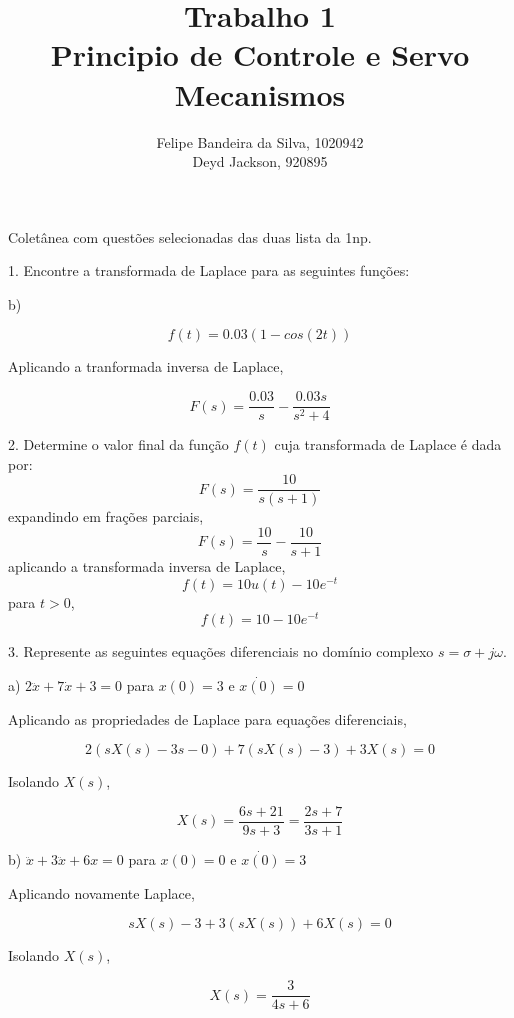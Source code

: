 \documentclass[paper=a4, fontsize=11pt]{article}
\title{Trabalho 1\\Principio de Controle e Servo Mecanismos}
\author{Felipe Bandeira da Silva, 1020942\\Deyd Jackson, 920895}
\begin{document}
\maketitle

Coletânea com questões selecionadas das duas lista da 1np.



\newpage

1. Encontre a transformada de Laplace para as seguintes funções:

b) 

$$
f(t) = 0.03(1 - cos(2t))
$$

Aplicando a tranformada inversa de Laplace,

$$
F(s) = \frac{0.03}{s} - \frac{0.03 s}{s^2+4}
$$

\newpage

2. Determine o valor final da função $f(t)$ cuja transformada de Laplace é dada por:
$$
F(s) = \frac{10}{s(s+1)}
$$
expandindo em frações parciais,
$$
F(s) = \frac{10}{s} - \frac{10}{s+1}
$$
aplicando a transformada inversa de Laplace,
$$
f(t) = 10 u(t) - 10 e^{-t}
$$
para $t>0$,
$$
f(t) = 10 - 10 e^{-t}
$$

\newpage

3. Represente as seguintes equações diferenciais no domínio complexo $s=\sigma + j \omega$.

a) $2 \ddot{x} + 7 \dot{x} +  3 = 0$ para $x(0)=3$ e $\dot{x(0)}=0$

Aplicando as propriedades de Laplace para equações diferenciais,

$$
2 (s X(s) - 3 s - 0) + 7 (s X(s) - 3) + 3 X(s) = 0
$$

Isolando $X(s)$,

$$
X(s) = \frac{6s + 21}{9 s + 3} = \frac{2 s + 7}{3 s + 1}
$$

b) $\ddot{x} + 3 \ddot{x} + 6 x = 0$ para $x(0) = 0$ e $\dot{x(0)}=3$

Aplicando novamente Laplace,

$$
s X(s) - 3 + 3 (s X(s)) + 6 X(s) = 0
$$

Isolando $X(s)$,

$$
X(s) = \frac{3}{4 s + 6}
$$
\end{document}
